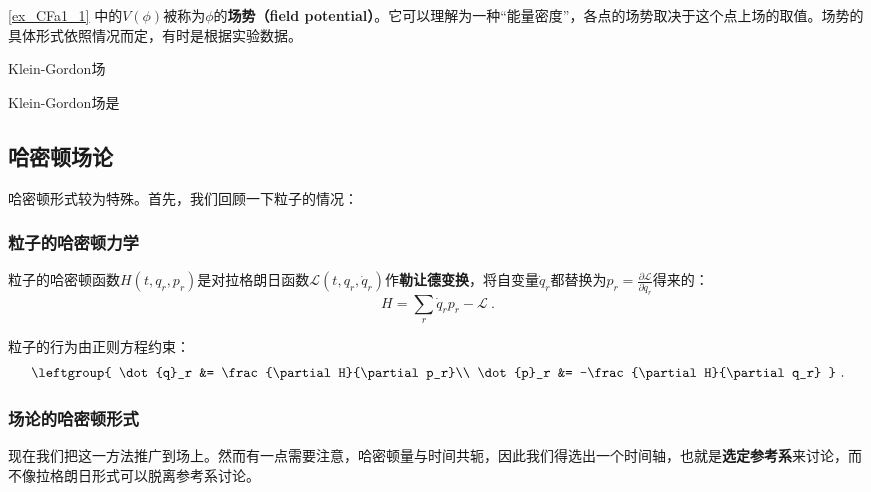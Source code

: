 \autoref{ex_CFa1_1} 中的$V(\phi)$被称为$\phi$的\textbf{场势（field potential）}。它可以理解为一种“能量密度”，各点的场势取决于这个点上场的取值。场势的具体形式依照情况而定，有时是根据实验数据。



\begin{example}{Klein-Gordon场}

Klein-Gordon场是

\end{example}




\subsection{哈密顿场论}

哈密顿形式较为特殊。首先，我们回顾一下粒子的情况：

\subsubsection{粒子的哈密顿力学}

粒子的哈密顿函数$H(t, q_r, p_r)$是对拉格朗日函数$\mathcal{L}(t, q_r, \dot{q}_r)$作\textbf{勒让德变换}，将自变量$\dot{q}_r$都替换为$p_r=\frac{\partial \mathcal{L}}{\partial \dot{q}_r}$得来的：
\begin{equation}
H = \sum_r \dot{q}_rp_r-\mathcal{L}~.
\end{equation}

粒子的行为由正则方程约束：
\begin{equation}
\leftgroup{
    \dot{q}_r &= \frac{\partial H}{\partial p_r}\\
    \dot{p}_r &= -\frac{\partial H}{\partial q_r}
}~.
\end{equation}



\subsubsection{场论的哈密顿形式}


现在我们把这一方法推广到场上。然而有一点需要注意，哈密顿量与时间共轭，因此我们得选出一个时间轴，也就是\textbf{选定参考系}来讨论，而不像拉格朗日形式可以脱离参考系讨论。




















